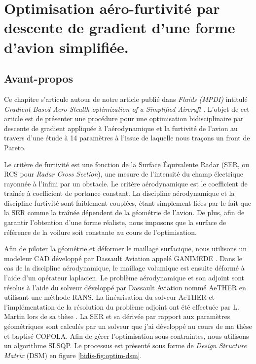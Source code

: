\chapter{Optimisation aéro-furtivité par descente de gradient d'une forme d'avion simplifiée.}
\label{ch:chapter2}


\minitoc

\section*{Avant-propos}
\label{sec:ch2-avantpropos}
Ce chapitre s'articule autour de notre article publié dans \textit{Fluids (MPDI)} intitulé \textit{Gradient Based Aero-Stealth optimization of a Simplified Aircraft} \citep{Thoulon2024}.
L'objet de cet article est de présenter une procédure pour une optimisation bidisciplinaire par descente de gradient appliquée à l'aérodynamique et la furtivité de l'avion au travers d'une étude à 14 paramètres à l'issue de laquelle nous traçons un front de Pareto.

Le critère de furtivité est une fonction de la Surface \'Equivalente Radar (SER, ou RCS pour \textit{Radar Cross Section}), une mesure de l'intensité du champ électrique rayonnée à l'infini par un obstacle. Le critère aérodynamique est le coefficient de traînée à coefficient de portance constant. La discipline aérodynamique et la discipline furtivité sont faiblement couplées, étant simplement liées par le fait que la SER comme la traînée dépendent de la géométrie de l'avion. De plus, afin de garantir l'obtention d'une forme réaliste, nous imposons que la surface de référence de la voilure soit constante au cours de l'optimisation.

Afin de piloter la géométrie et déformer le maillage surfacique, nous utilisons un modeleur CAD développé par Dassault Aviation appelé GANIMEDE \citep{Kleinveld2008}. Dans le cas de la discipline aérodynamique, le maillage volumique est ensuite déformé à l'aide d'un opérateur laplacien. Le problème aérodynamique et son adjoint sont résolus à l'aide du solveur développé par Dassault Aviation nommé AeTHER \citep{Chalot2004} en utilisant une méthode RANS. La linéarisation du solveur AeTHER et l'implémentation de la résolution du problème adjoint ont été effectuée par L. Martin lors de sa thèse \citep{Martin2010}. La SER et sa dérivée par rapport aux paramètres géométriques sont calculés par un solveur que j'ai développé au cours de ma thèse et baptisé COPOLA. Afin de gérer l'optimisation sous contraintes, nous utilisons un algorithme SLSQP. Le processus est présenté sous forme de \textit{Design Structure Matrix} (DSM) en figure \ref{bidis-fig:optim-dsm}.

